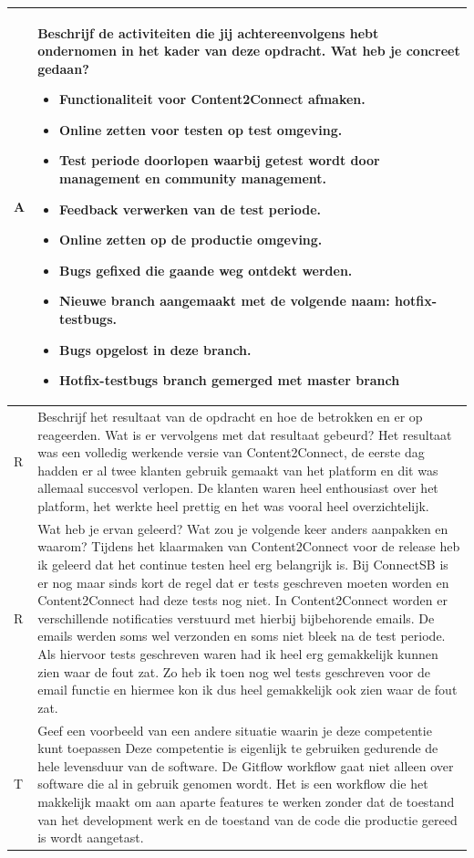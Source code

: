 \begin{tabularx}{\textwidth}{| l | X |}
\\
\hline
A & Beschrijf de activiteiten die jij achtereenvolgens hebt ondernomen in het kader van deze opdracht. Wat heb je concreet gedaan?
\begin{itemize}
\item Functionaliteit voor Content2Connect afmaken.
\item Online zetten voor testen op test omgeving.
\item Test periode doorlopen waarbij getest wordt door management en community management.
\item Feedback verwerken van de test periode.
\item Online zetten op de productie omgeving.
\item Bugs gefixed die gaande weg ontdekt werden.
\item Nieuwe branch aangemaakt met de volgende naam: hotfix-testbugs.
\item Bugs opgelost in deze branch.
\item Hotfix-testbugs branch gemerged met master branch
\end{itemize}
\\
\hline
R & Beschrijf het resultaat van de opdracht en hoe de betrokken en er op reageerden. Wat is er vervolgens met dat resultaat gebeurd?
\newline
\newline
Het resultaat was een volledig werkende versie van  Content2Connect, de eerste dag hadden er al twee klanten gebruik gemaakt van het platform en dit was allemaal succesvol verlopen. De klanten waren heel enthousiast over het platform, het werkte heel prettig en het was vooral heel overzichtelijk.
\\
\hline
R & Wat heb je ervan geleerd? Wat zou je volgende keer anders aanpakken en waarom?
\newline
\newline
Tijdens het klaarmaken van Content2Connect voor de release heb ik geleerd dat het continue testen heel erg belangrijk is. Bij ConnectSB is er nog maar sinds kort de regel dat er tests geschreven moeten worden en Content2Connect had deze tests nog niet. In Content2Connect worden er verschillende notificaties verstuurd met hierbij bijbehorende emails. De emails werden soms wel verzonden en soms niet bleek na de test periode. Als hiervoor tests geschreven waren had ik heel erg gemakkelijk kunnen zien waar de fout zat. Zo heb ik toen nog wel tests geschreven voor de email functie en hiermee kon ik dus heel gemakkelijk ook zien waar de fout zat.
\\
\hline
T & Geef een voorbeeld van een andere situatie waarin je deze competentie kunt toepassen
\newline
\newline
Deze competentie is eigenlijk te gebruiken gedurende de hele levensduur van de software. De Gitflow workflow gaat niet alleen over software die al in gebruik genomen wordt. Het is een workflow die het makkelijk maakt om aan aparte features te werken zonder dat de toestand van het development werk en de toestand van de code die productie gereed is wordt aangetast.
\\
\hline
\end{tabularx}

